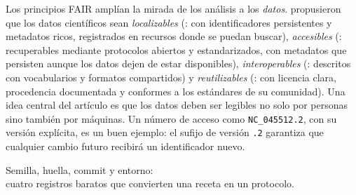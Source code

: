 Los principios FAIR amplían la mirada de los análisis a los \emph{datos}. \textcite{c00-wilkinson2016} propusieron que los datos científicos sean \emph{localizables} (: con identificadores persistentes y metadatos ricos, registrados en recursos donde se puedan buscar), \emph{accesibles} (: recuperables mediante protocolos abiertos y estandarizados, con metadatos que persisten aunque los datos dejen de estar disponibles), \emph{interoperables} (: descritos con vocabularios y formatos compartidos) y \emph{reutilizables} (: con licencia clara, procedencia documentada y conformes a los estándares de su comunidad). Una idea central del artículo es que los datos deben ser legibles no solo por personas sino también por máquinas. Un número de acceso como \texttt{NC\_045512.2}, con su versión explícita, es un buen ejemplo: el sufijo de versión \texttt{.2} garantiza que cualquier cambio futuro recibirá un identificador nuevo.

\begin{ideaclave}
Semilla, huella, commit y entorno:\\ cuatro registros baratos que convierten una receta en un protocolo.
\end{ideaclave}

